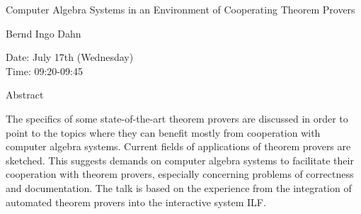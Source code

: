 \begin{center}
\LARGE
Computer Algebra Systems in an Environment of
                Cooperating Theorem Provers 

\end{center}

\begin{center}
\Large
Bernd Ingo Dahn

\end{center}

\noindent
Date:  July 17th (Wednesday)\\
Time: 09:20-09:45\\

\begin{center}
\large
Abstract
\end{center}

The specifics of some state-of-the-art theorem provers are discussed
in order to point to the topics where they can benefit mostly from
cooperation with computer algebra systems. Current fields of
applications of theorem provers are sketched. This suggests demands on
computer algebra systems to facilitate their cooperation with theorem
provers, especially concerning problems of correctness and
documentation. The talk is based on the experience from the
integration of automated theorem provers into the interactive system
ILF.

